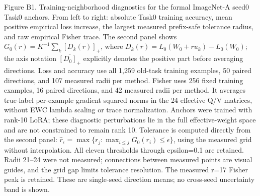 \caption{Figure B1. Training-neighborhood diagnostics for the formal ImageNet-A seed0 Task0 anchors. From left to right: absolute Task0 training accuracy, mean positive empirical loss increase, the largest measured prefix-safe tolerance radius, and raw empirical Fisher trace. The second panel shows $G_0(r)=K^{-1}\sum_k[D_k(r)]_+$, where $D_k(r)=L_0(W_0+ru_k)-L_0(W_0)$; the axis notation $\overline{[D_0]_+}$ explicitly denotes the positive part before averaging directions. Loss and accuracy use all 1,259 old-task training examples, 50 paired directions, and 107 measured radii per method. Fisher uses 256 fixed training examples, 16 paired directions, and 42 measured radii per method. It averages true-label per-example gradient squared norms in the 24 effective Q/V matrices, without EWC lambda scaling or trace normalization. Anchors were trained with rank-10 LoRA; these diagnostic perturbations lie in the full effective-weight space and are not constrained to remain rank 10. Tolerance is computed directly from the second panel: $\hat r_\epsilon=\max\{r_j:\max_{i\leq j}G_0(r_i)\leq\epsilon\}$, using the measured grid without interpolation. All eleven thresholds through epsilon=0.1 are retained. Radii 21–24 were not measured; connections between measured points are visual guides, and the grid gap limits tolerance resolution. The measured r=17 Fisher peak is retained. These are single-seed direction means; no cross-seed uncertainty band is shown.}
